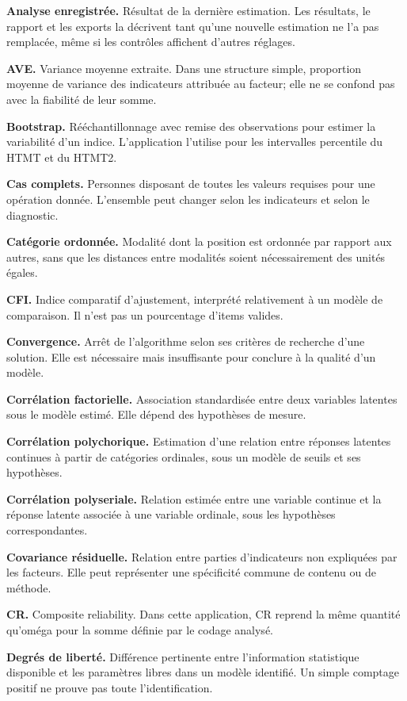\documentclass[
  french,
  11pt,
  a4paper,
  DIV=11,
  numbers=noendperiod]{scrreprt}
\begin{document}
\textbf{Analyse enregistrée.} Résultat de la dernière estimation. Les
résultats, le rapport et les exports la décrivent tant qu'une nouvelle
estimation ne l'a pas remplacée, même si les contrôles affichent
d'autres réglages.

\textbf{AVE.} Variance moyenne extraite. Dans une structure simple,
proportion moyenne de variance des indicateurs attribuée au facteur;
elle ne se confond pas avec la fiabilité de leur somme.

\textbf{Bootstrap.} Rééchantillonnage avec remise des observations pour
estimer la variabilité d'un indice. L'application l'utilise pour les
intervalles percentile du HTMT et du HTMT2.

\textbf{Cas complets.} Personnes disposant de toutes les valeurs
requises pour une opération donnée. L'ensemble peut changer selon les
indicateurs et selon le diagnostic.

\textbf{Catégorie ordonnée.} Modalité dont la position est ordonnée par
rapport aux autres, sans que les distances entre modalités soient
nécessairement des unités égales.

\textbf{CFI.} Indice comparatif d'ajustement, interprété relativement à
un modèle de comparaison. Il n'est pas un pourcentage d'items valides.

\textbf{Convergence.} Arrêt de l'algorithme selon ses critères de
recherche d'une solution. Elle est nécessaire mais insuffisante pour
conclure à la qualité d'un modèle.

\textbf{Corrélation factorielle.} Association standardisée entre deux
variables latentes sous le modèle estimé. Elle dépend des hypothèses de
mesure.

\textbf{Corrélation polychorique.} Estimation d'une relation entre
réponses latentes continues à partir de catégories ordinales, sous un
modèle de seuils et ses hypothèses.

\textbf{Corrélation polyseriale.} Relation estimée entre une variable
continue et la réponse latente associée à une variable ordinale, sous
les hypothèses correspondantes.

\textbf{Covariance résiduelle.} Relation entre parties d'indicateurs non
expliquées par les facteurs. Elle peut représenter une spécificité
commune de contenu ou de méthode.

\textbf{CR.} Composite reliability. Dans cette application, CR reprend
la même quantité qu'oméga pour la somme définie par le codage analysé.

\textbf{Degrés de liberté.} Différence pertinente entre l'information
statistique disponible et les paramètres libres dans un modèle
identifié. Un simple comptage positif ne prouve pas toute
l'identification.
\end{document}

